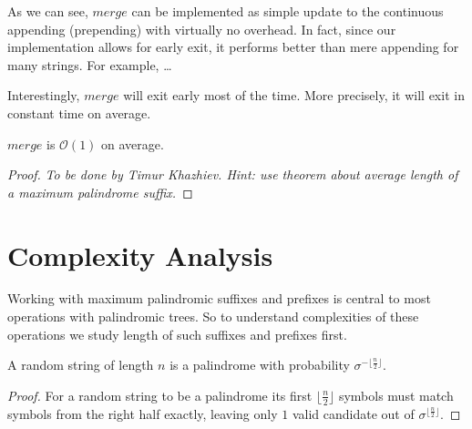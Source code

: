 As we can see, $merge$ can be implemented as simple update
to the continuous appending (prepending) with virtually no overhead.
In fact, since our implementation allows for early exit,
it performs better than mere appending for many strings.
For example, \ldots

Interestingly, $merge$ will exit early most of the time.
More precisely, it will exit in constant time on average.

\begin{theorem}
  $merge$ is $\mathcal{O}(1)$ on average.
\end{theorem}
\begin{proof}
  \emph{To be done by Timur Khazhiev. Hint: use theorem about average length of a maximum palindrome suffix.}
\end{proof}

\section{Complexity Analysis}

Working with maximum palindromic suffixes and prefixes
is central to most operations with palindromic trees.
So to understand complexities of these operations we
study length of such suffixes and prefixes first.

\begin{lemma}
\label{lemma-palindrome-prob}
  A random string of length $n$ is a palindrome with probability $\sigma^{- \lfloor\frac{n}{2}\rfloor}$.
\end{lemma}
\begin{proof}
  For a random string to be a palindrome its first $\lfloor\frac{n}{2}\rfloor$
  symbols must match symbols from the right half exactly, leaving only
  $1$ valid candidate out of $\sigma^{\lfloor\frac{n}{2}\rfloor}$.
\end{proof}

